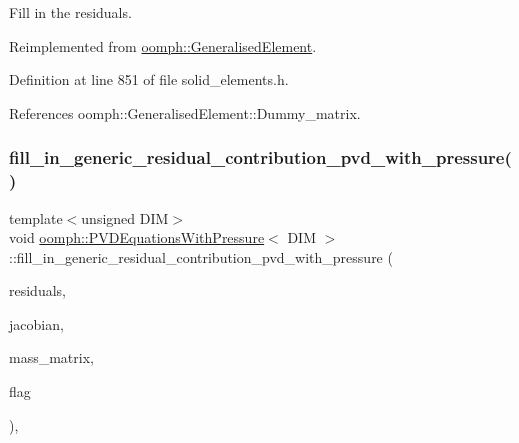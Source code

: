 Fill in the residuals. 



Reimplemented from \hyperlink{classoomph_1_1GeneralisedElement_a310c97f515e8504a48179c0e72c550d7}{oomph\+::\+Generalised\+Element}.



Definition at line 851 of file solid\+\_\+elements.\+h.



References oomph\+::\+Generalised\+Element\+::\+Dummy\+\_\+matrix.

\mbox{\label{classoomph_1_1PVDEquationsWithPressure_a59c8c6164edf79148deb8dbeab79376d}} 
\subsubsection{\texorpdfstring{fill\+\_\+in\+\_\+generic\+\_\+residual\+\_\+contribution\+\_\+pvd\+\_\+with\+\_\+pressure()}{fill\_in\_generic\_residual\_contribution\_pvd\_with\_pressure()}}
{\footnotesize\ttfamily template$<$unsigned D\+IM$>$ \\
void \hyperlink{classoomph_1_1PVDEquationsWithPressure}{oomph\+::\+P\+V\+D\+Equations\+With\+Pressure}$<$ D\+IM $>$\+::fill\+\_\+in\+\_\+generic\+\_\+residual\+\_\+contribution\+\_\+pvd\+\_\+with\+\_\+pressure (\begin{DoxyParamCaption}\item[{\hyperlink{classoomph_1_1Vector}{Vector}$<$ double $>$ \&}]{residuals,  }\item[{\hyperlink{classoomph_1_1DenseMatrix}{Dense\+Matrix}$<$ double $>$ \&}]{jacobian,  }\item[{\hyperlink{classoomph_1_1DenseMatrix}{Dense\+Matrix}$<$ double $>$ \&}]{mass\+\_\+matrix,  }\item[{const unsigned \&}]{flag }\end{DoxyParamCaption})\hspace{0.3cm}{\ttfamily [protected]}, {\ttfamily [virtual]}}



